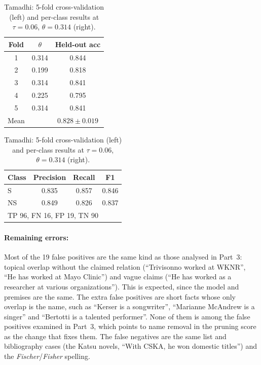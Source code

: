 \documentclass[12pt,a4paper]{article}
\begin{document}
\begin{table}[H]
\centering
\begin{minipage}[c]{0.44\linewidth}
\centering
\small
\begin{tabular}{ccc}
\toprule
Fold & $\theta$ & Held-out acc \\
\midrule
1 & 0.314 & 0.844 \\
2 & 0.199 & 0.818 \\
3 & 0.314 & 0.841 \\
4 & 0.225 & 0.795 \\
5 & 0.314 & 0.841 \\
\midrule
Mean & & $0.828 \pm 0.019$ \\
\bottomrule
\end{tabular}
\end{minipage}\hfill
\begin{minipage}[c]{0.52\linewidth}
\centering
\small
\begin{tabular}{lccc}
\toprule
Class & Precision & Recall & F1 \\
\midrule
S  & 0.835 & 0.857 & 0.846 \\
NS & 0.849 & 0.826 & 0.837 \\
\midrule
\multicolumn{4}{l}{TP 96, FN 16, FP 19, TN 90} \\
\bottomrule
\end{tabular}
\end{minipage}
\caption{Tamadhi: 5-fold cross-validation (left) and per-class results at $\tau = 0.06$, $\theta = 0.314$ (right).}
\label{tab:tam-cv}
\end{table}

\paragraph{Remaining errors:} Most of the 19 false positives are the same kind as those analysed in Part~3: topical overlap without the claimed relation (``Trivisonno worked at WKNR'', ``He has worked at Mayo Clinic'') and vague claims (``He has worked as a researcher at various organizations''). This is expected, since the model and premises are the same. The extra false positives are short facts whose only overlap is the name, such as ``Kerser is a songwriter'', ``Marianne McAndrew is a singer'' and ``Bertotti is a talented performer''. None of them is among the false positives examined in Part~3, which points to name removal in the pruning score as the change that fixes them. The false negatives are the same list and bibliography cases (the Katsu novels, ``With CSKA, he won domestic titles'') and the \textit{Fischer}/\textit{Fisher} spelling.
\end{document}
